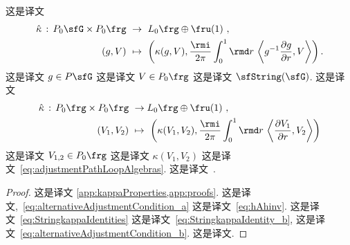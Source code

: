 \documentclass[
    affil-it, %
    auth-lg, %
    british, %
    compression, %
    contents, %
    custom-packages={}, %
    references={bigone}, %
]{lib/preprint}
\begin{document}
\begin{body}
        \begin{proposition}
            这是译文 
            \begin{equation}\label{eq:adjustmentStringGroup}
                \begin{aligned}
                    \hat\kappa\,:\,P_0\sfG\times P_0\frg\ &\rightarrow\ L_0\frg\oplus\fru(1)~,
                    \\
                    (g,V)\ &\mapsto\ \left(\kappa(g,V),\frac{\rmi}{2\pi}\int_0^1\rmd r\,\innerLarge{g^{-1}\parder[g]{r}}{V}\right).
                \end{aligned}
            \end{equation}  这是译文 $g\in P\sfG$ 这是译文 $V\in P_0\frg$ 这是译文 $\sfString(\sfG)$. 这是译文 
            \begin{equation}\label{eq:adjustmentStringAlgebra}
                \begin{aligned}
                    \hat\kappa\,:\,P_0\frg\times P_0\frg\ &\rightarrow L_0\frg\oplus\fru(1)~,
                    \\
                    (V_1,V_2)\ &\mapsto\ \left(\kappa(V_1,V_2),\frac{\rmi}{2\pi}\int_0^1\rmd r\,\innerLarge{\parder[V_1]{r}}{V_2}\right)
                \end{aligned}
            \end{equation}  这是译文 $V_{1,2}\in P_0\frg$ 这是译文 $\kappa(V_1,V_2)$ 这是译文~\eqref{eq:adjustmentPathLoopAlgebras}. 这是译文~\cite{Saemann:2017rjm,Saemann:2019dsl}. 
        \end{proposition}

        \begin{proof}
            这是译文 \cref{app:kappaProperties,app:proofs}. 这是译文,~\eqref{eq:alternativeAdjustmentCondition_a} 这是译文~\eqref{eq:hAhinv}. 这是译文~\eqref{eq:StringkappaIdentities} 这是译文~\eqref{eq:StringkappaIdentity_b}, 这是译文~\eqref{eq:alternativeAdjustmentCondition_b}. 这是译文.
        \end{proof}


\end{body}
\end{document}
